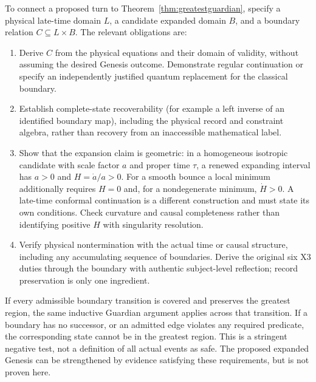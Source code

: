 \documentclass[11pt,a4paper]{article}
\begin{document}
To connect a proposed turn to Theorem~\ref{thm:greatestguardian}, specify a physical late-time domain $L$, a candidate expanded domain $B$, and a boundary relation $C\subseteq L\times B$. The relevant obligations are:
\begin{enumerate}
\item Derive $C$ from the physical equations and their domain of validity, without assuming the desired Genesis outcome. Demonstrate regular continuation or specify an independently justified quantum replacement for the classical boundary.
\item Establish complete-state recoverability (for example a left inverse of an identified boundary map), including the physical record and constraint algebra, rather than recovery from an inaccessible mathematical label.
\item Show that the expansion claim is geometric: in a homogeneous isotropic candidate with scale factor $a$ and proper time $\tau$, a renewed expanding interval has $a>0$ and $H=\dot a/a>0$. For a smooth bounce a local minimum additionally requires $H=0$ and, for a nondegenerate minimum, $\dot H>0$. A late-time conformal continuation is a different construction and must state its own conditions. Check curvature and causal completeness rather than identifying positive $H$ with singularity resolution.
\item Verify physical nontermination with the actual time or causal structure, including any accumulating sequence of boundaries. Derive the original six X3 duties through the boundary with authentic subject-level reflection; record preservation is only one ingredient.
\end{enumerate}
If every admissible boundary transition is covered and preserves the greatest region, the same inductive Guardian argument applies across that transition. If a boundary has no successor, or an admitted edge violates any required predicate, the corresponding state cannot be in the greatest region. This is a stringent negative test, not a definition of all actual events as safe. The proposed expanded Genesis can be strengthened by evidence satisfying these requirements, but is not proven here.
\end{document}
